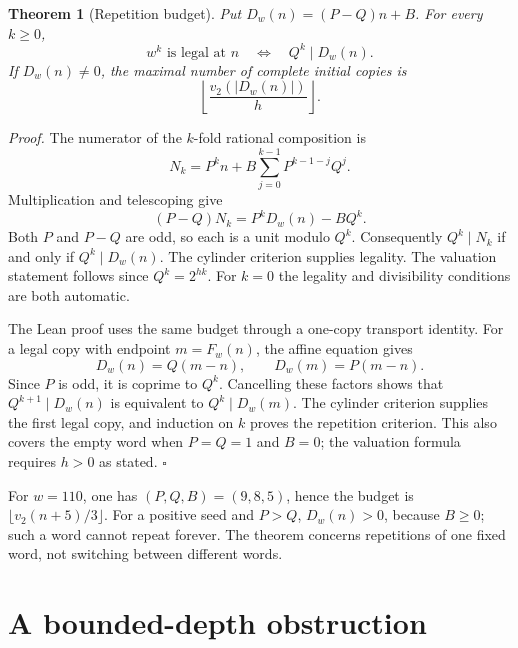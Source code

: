 \documentclass[11pt,letterpaper]{article}
\newtheorem{theorem}{Theorem}
\newenvironment{proof}{\noindent\textit{Proof.}}{\hfill\(\square\)}
\begin{document}
\begin{theorem}[Repetition budget]
Put \(D_w(n)=(P-Q)n+B\). For every \(k\ge0\),
\[
w^k\text{ is legal at }n\quad\Longleftrightarrow\quad Q^k\mid D_w(n).
\]
If \(D_w(n)\ne0\), the maximal number of complete initial copies is
\[
\left\lfloor\frac{v_2(|D_w(n)|)}h\right\rfloor.
\]
\end{theorem}
\begin{proof}
The numerator of the \(k\)-fold rational composition is
\[
N_k=P^kn+B\sum_{j=0}^{k-1}P^{k-1-j}Q^j.
\]
Multiplication and telescoping give
\[
(P-Q)N_k=P^kD_w(n)-BQ^k.
\]
Both \(P\) and \(P-Q\) are odd, so each is a unit modulo \(Q^k\).
Consequently \(Q^k\mid N_k\) if and only if \(Q^k\mid D_w(n)\).
The cylinder criterion supplies legality. The valuation statement
follows since \(Q^k=2^{hk}\). For \(k=0\) the legality and divisibility
conditions are both automatic.

The Lean proof uses the same budget through a one-copy transport identity.
For a legal copy with endpoint \(m=F_w(n)\), the affine equation gives
\[
D_w(n)=Q(m-n),\qquad D_w(m)=P(m-n).
\]
Since \(P\) is odd, it is coprime to \(Q^k\). Cancelling these factors
shows that \(Q^{k+1}\mid D_w(n)\) is equivalent to
\(Q^k\mid D_w(m)\). The cylinder criterion supplies the first legal copy,
and induction on \(k\) proves the repetition criterion. This also covers
the empty word when \(P=Q=1\) and \(B=0\); the valuation formula requires
\(h>0\) as stated.
\end{proof}

For \(w=110\), one has \((P,Q,B)=(9,8,5)\), hence the budget is
\(\lfloor v_2(n+5)/3\rfloor\). For a positive seed and \(P>Q\),
\(D_w(n)>0\), because \(B\ge0\); such a word cannot repeat forever.
The theorem concerns repetitions of one fixed word, not switching
between different words.

\section{A bounded-depth obstruction}
\end{document}
